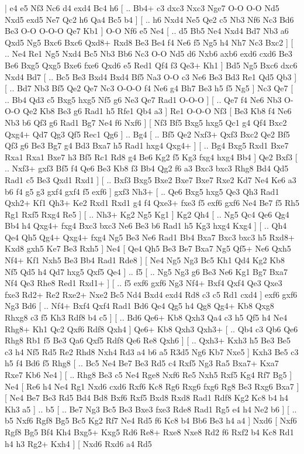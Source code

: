 \makegametitle 
|   e4   e5    Nf3   Nc6    d4   exd4    Bc4   h6 [ .. Bb4+  c3 dxc3  Nxc3 Nge7  O-O O-O  Nd5 Nxd5  exd5 Ne7  Qc2 h6  Qa4 Bc5  b4   ]  [ .. h6  Nxd4 Ne5  Qe2 c5  Nb3 Nf6  Nc3 Bd6  Be3 O-O  O-O-O Qe7  Kb1   ]  O-O   Nf6    e5   Ne4    [ .. d5  Bb5 Ne4  Nxd4 Bd7  Nb3 a6  Qxd5 Ng5  Bxc6 Bxc6  Qxd8+ Rxd8  Be3 Be4  f4 Ne6  f5 Ng5  h4 Nh7  Nc3 Bxc2   ]  [ .. Ne4  Re1 Ng5  Nxd4 Bc5  Nb3 Bb6  Nc3 O-O  Nd5 d6  Nxb6 axb6  exd6 cxd6  Be3 Be6  Bxg5 Qxg5  Bxe6 fxe6  Qxd6 e5  Red1 Qf4  f3 Qe3+  Kh1   ]  Bd5   Ng5    Bxc6   dxc6    Nxd4   Bd7 [ .. Bc5  Be3 Bxd4  Bxd4 Bf5  Na3 O-O  c3 Ne6  Be3 Bd3  Re1 Qd5  Qb3   ]  [ .. Bd7  Nb3 Bf5  Qe2 Qe7  Nc3 O-O-O  f4 Ne6  g4 Bh7  Be3 h5  f5 Ng5   ]  Nc3   Qe7 [ .. Bb4  Qd3 c5  Bxg5 hxg5  Nf5 g6  Ne3 Qe7  Rad1 O-O-O   ]  [ .. Qe7  f4 Ne6  Nb3 O-O-O  Qe2 Kb8  Be3 g6  Rad1 h5  Rfe1 Qb4  a3   ]  Re1   O-O-O    Nf3 [  Be3 Kb8  f4 Ne6  Nb3 b6  Qf3 g6  Rad1 Bg7  Ne4 f6  Nxf6   ]  [  Nf3 Bf5  Bxg5 hxg5  Qc1 g4  Qf4 Bxc2  Qxg4+ Qd7  Qg3 Qf5  Rec1 Qg6   ] .. Bg4 [ .. Bf5  Qe2 Nxf3+  Qxf3 Bxc2  Qe2 Bf5  Qf3 g6  Be3 Bg7  g4 Bd3  Bxa7 h5  Rad1 hxg4  Qxg4+   ]  [ .. Bg4  Bxg5 Rxd1  Bxe7 Rxa1  Rxa1 Bxe7  h3 Bf5  Rc1 Rd8  g4 Be6  Kg2 f5  Kg3 fxg4  hxg4 Bb4   ]  Qe2   Bxf3 [ .. Nxf3+  gxf3 Bf5  f4 Qe6  Be3 Kb8  f3 Bb4  Qg2 f6  a3 Bxc3  bxc3 Rhg8  Bd4 Qd5  Rad1 c5  Be3 Qxd1  Rxd1   ]  [ .. Bxf3  Bxg5 Bxe2  Bxe7 Bxe7  Rxe2 Kd7  Ne4 Ke6  a3 b6  f4 g5  g3 gxf4  gxf4 f5  exf6   ]  gxf3   Nh3+ [ .. Qe6  Bxg5 hxg5  Qe3 Qh3  Rad1 Qxh2+  Kf1 Qh3+  Ke2 Rxd1  Rxd1 g4  f4 Qxe3+  fxe3 f5  exf6 gxf6  Ne4 Be7  f5 Rh5  Rg1 Rxf5  Rxg4 Re5   ]  [ .. Nh3+  Kg2 Ng5  Kg1   ]  Kg2   Qh4 [ .. Ng5  Qc4 Qe6  Qg4 Bb4  h4 Qxg4+  fxg4 Bxc3  bxc3 Ne6  Be3 b6  Rad1 h5  Kg3 hxg4  Kxg4   ]  [ .. Qh4  Qe4 Qh5  Qg4+ Qxg4+  fxg4 Ng5  Be3 Ne6  Rad1 Bb4  Bxa7 Bxc3  bxc3 h5  Rxd8+ Kxd8  gxh5 Ke7  Be3 Rxh5   ]  Ne4 [  Qe4 Qh5  Be3 Be7  Bxa7 Ng5  Qf5+ Ne6  Qxh5 Nf4+  Kf1 Nxh5  Be3 Bb4  Rad1 Rde8   ]  [  Ne4 Ng5  Ng3 Bc5  Kh1 Qd4  Kg2 Kb8  Nf5 Qd5  h4 Qd7  hxg5 Qxf5  Qe4   ] .. f5 [ .. Ng5  Ng3 g6  Be3 Ne6  Kg1 Bg7  Bxa7 Nf4  Qe3 Rhe8  Red1 Rxd1+   ]  [ .. f5  exf6 gxf6  Ng3 Nf4+  Bxf4 Qxf4  Qe3 Qxe3  fxe3 Rd2+  Re2 Rxe2+  Nxe2 Bc5  Nd4 Bxd4  exd4 Rd8  c3 c5  Rd1 cxd4   ]  exf6   gxf6    Ng3   Bd6 [ .. Nf4+  Bxf4 Qxf4  Rad1 Bd6  Qe4 Qg5  h4 Qg8  Qg4+ Kb8  Qxg8 Rhxg8  c3 f5  Kh3 Rdf8  b4 c5   ]  [ .. Bd6  Qe6+ Kb8  Qxh3 Qa4  c3 h5  Qf5 h4  Ne4 Rhg8+  Kh1 Qc2  Qxf6 Rdf8  Qxh4   ]  Qe6+   Kb8    Qxh3   Qxh3+ [ .. Qb4  c3 Qb6  Qe6 Rhg8  Rb1 f5  Be3 Qa6  Qxf5 Rdf8  Qe6 Re8  Qxh6   ]  [ .. Qxh3+  Kxh3 h5  Be3 Be5  c3 h4  Nf5 Rd5  Re2 Rhd8  Nxh4 Rd3  a4 b6  a5 R3d5  Ng6 Kb7  Nxe5   ]  Kxh3   Be5    c3   h5    f4   Bd6    f5   Rhg8 [ .. Bc5  Ne4 Be7  Be3 Rd5  c4 Rxf5  Ng3 Ra5  Bxa7+ Kxa7  Rxe7 Kb6  Ne4   ]  [ .. Rhg8  Be3 c5  Ne4 Rge8  Nxf6 Re5  Nxh5 Rxf5  Kg4 Rf7  Bg5   ]  Ne4 [  Re6 h4  Ne4 Rg1  Nxd6 cxd6  Rxf6 Kc8  Rg6 Rxg6  fxg6 Rg8  Be3 Rxg6  Bxa7   ]  [  Ne4 Be7  Be3 Rd5  Bd4 Bd8  Bxf6 Rxf5  Bxd8 Rxd8  Rad1 Rdf8  Kg2 Kc8  b4 h4  Kh3 a5   ] .. b5 [ .. Be7  Ng3 Bc5  Be3 Bxe3  fxe3 Rde8  Rad1 Rg5  e4 h4  Ne2 b6   ]  [ .. b5  Nxf6 Rgf8  Bg5 Bc5  Kg2 Rf7  Ne4 Rd5  f6 Kc8  b4 Bb6  Be3 h4  a4   ]  Nxd6 [  Nxf6 Rgf8  Bg5 Bf4  Kh4 Bxg5+  Kxg5 Rd6  Re8+ Rxe8  Nxe8 Rd2  f6 Rxf2  b4 Kc8  Rd1 h4  h3 Rg2+  Kxh4   ]  [  Nxd6 Rxd6  a4 Rd5  